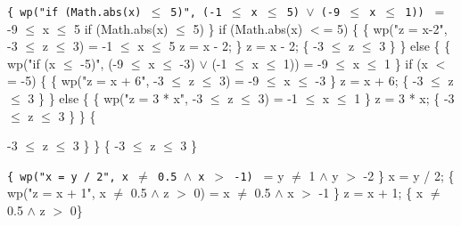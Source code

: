 \documentclass[11pt]{article}
\begin{document}
\begin{enumerate}
{\item
\texttt{\{ wp("if (Math.abs(x) $\leq$ 5)", (-1 $\leq$ x $\leq$ 5) $\vee$ (-9 $\leq$ x $\leq$ 1)) } = { -9 $\leq$ x $\leq$ 5 } if (Math.abs(x) $\leq$ 5) \}
\newline
if (Math.abs(x) $<$= 5) \{
\newline
\hspace*{1cm}\{ { wp("z = x-2", -3 $\leq$ z $\leq$ 3) } = { -1 $\leq$ x $\leq$ 5 } z = x - 2; \}
\newline
\hspace*{0.5cm} z = x - 2;
\newline
\hspace*{1cm}\{ -3 $\leq$ z $\leq$ 3 \}
\newline
\} else \{
\newline
\hspace*{1cm}\{ wp("if (x $\leq$ -5)", (-9 $\leq$ x $\leq$ -3) $\vee$ (-1 $\leq$ x $\leq$ 1)) = { -9 $\leq$ x $\leq$ 1 }\}
\newline
\hspace*{0.5cm}if (x $<$= -5) \{
\newline
\hspace*{1.5cm}\{ { wp("z = x + 6", -3 $\leq$ z $\leq$ 3) } = { -9 $\leq$ x $\leq$ -3 }\}
\newline
\hspace*{1cm}z = x + 6;
\newline
\hspace*{1.5cm}\{ -3 $\leq$ z $\leq$ 3 \}
\newline
\hspace*{0.5cm}\} else \{
\newline
\hspace*{1.5cm}\{ { wp("z = 3 * x", -3 $\leq$ z $\leq$ 3) } = { -1 $\leq$ x $\leq$ 1 }\}
\newline
\hspace*{1cm}z = 3 * x;
\newline
\hspace*{1.5cm}\{ -3 $\leq$ z $\leq$ 3 \}
\newline
\hspace*{0.5cm}\}
\newline
\hspace*{1cm}\{ { -3 $\leq$ z $\leq$ 3 \}
\newline
\}
\newline
\{ {-3 $\leq$ z $\leq$ 3 \} }

\item \texttt{\{ wp("x = y / 2", x $\neq$ 0.5 $\wedge$ x $>$ -1) } = { y $\neq$ 1 $\wedge$ y $>$ -2 \}
\newline
x = y / 2;
\newline
\hspace*{0.5cm}\{ wp("z = x + 1", x $\neq$ 0.5 $\wedge$ z $>$ 0) } = { x $\neq$ 0.5 $\wedge$ x $>$ -1 \}
\newline
z = x + 1;
\newline
\{ x $\neq$ 0.5 $\land$ z $>$ 0\}}
}}
\end{enumerate}
\end{document}
